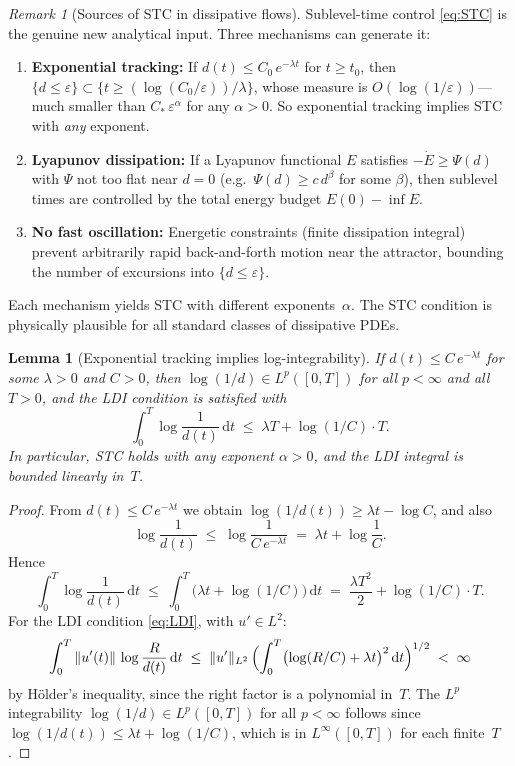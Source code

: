 \documentclass[12pt,a4paper]{article}
\theoremstyle{definition}
\theoremstyle{plain}
\newtheorem{lemma}[definition]{Lemma}
\theoremstyle{remark}
\newtheorem{remark}[definition]{Remark}
\begin{document}
\begin{remark}[Sources of STC in dissipative flows]
\label{rem:STC-sources}
Sublevel-time control \eqref{eq:STC} is the genuine new
analytical input.  Three mechanisms can generate it:

\begin{enumerate}[label=(\roman*)]
  \item \textbf{Exponential tracking:}\;
    If $d(t) \le C_0\,e^{-\lambda t}$ for $t \ge t_0$, then
    $\{d \le \varepsilon\} \subset
    \{t \ge (\log(C_0/\varepsilon))/\lambda\}$,
    whose measure is $O(\log(1/\varepsilon))$---much smaller than
    $C_*\,\varepsilon^\alpha$ for any $\alpha > 0$.
    So exponential tracking implies STC with \emph{any} exponent.
  \item \textbf{Lyapunov dissipation:}\;
    If a Lyapunov functional $E$ satisfies
    $-\dot{E} \ge \Psi(d)$ with $\Psi$ not too flat near $d=0$
    (e.g.\ $\Psi(d) \ge c\,d^\beta$ for some $\beta$),
    then sublevel times are controlled by the total energy budget
    $E(0) - \inf E$.
  \item \textbf{No fast oscillation:}\;
    Energetic constraints (finite dissipation integral)
    prevent arbitrarily rapid back-and-forth motion near the
    attractor, bounding the number of excursions into
    $\{d \le \varepsilon\}$.
\end{enumerate}
Each mechanism yields STC with different exponents~$\alpha$.
The STC condition is physically plausible for all standard
classes of dissipative PDEs.
\end{remark}

\begin{lemma}[Exponential tracking implies log-integrability]
\label{lem:stc-tracking}
If $d(t) \le C\,e^{-\lambda t}$ for some $\lambda > 0$ and
$C > 0$, then $\log(1/d) \in L^p([0,T])$ for all $p < \infty$
and all $T > 0$, and the LDI condition is satisfied with
\[
  \int_0^T \log\frac{1}{d(t)}\,\mathrm{d}t
  \;\le\;
  \lambda T + \log(1/C)\cdot T.
\]
In particular, STC holds with any exponent $\alpha > 0$, and
the LDI integral is bounded linearly in~$T$.
\end{lemma}

\begin{proof}
From $d(t) \le C\,e^{-\lambda t}$ we obtain
$\log(1/d(t)) \ge \lambda t - \log C$, and also
\[
  \log\frac{1}{d(t)}
  \;\le\;
  \log\frac{1}{C\,e^{-\lambda t}}
  \;=\;
  \lambda t + \log\frac{1}{C}.
\]
Hence
\[
  \int_0^T \log\frac{1}{d(t)}\,\mathrm{d}t
  \;\le\;
  \int_0^T \bigl(\lambda t + \log(1/C)\bigr)\,\mathrm{d}t
  \;=\;
  \frac{\lambda T^2}{2} + \log(1/C)\cdot T.
\]
For the LDI condition \eqref{eq:LDI}, with $u' \in L^2$:
\[
  \int_0^T \|u'(t)\|\,\log\frac{R}{d(t)}\,\mathrm{d}t
  \;\le\;
  \|u'\|_{L^2}\,
  \Bigl(\int_0^T \bigl(\log(R/C) + \lambda t\bigr)^2\,\mathrm{d}t
  \Bigr)^{1/2}
  \;<\; \infty
\]
by H\"older's inequality, since the right factor is a polynomial
in~$T$.  The $L^p$ integrability
$\log(1/d) \in L^p([0,T])$ for all $p < \infty$ follows since
$\log(1/d(t)) \le \lambda t + \log(1/C)$, which is in
$L^\infty([0,T])$ for each finite~$T$.
\end{proof}
\end{document}

